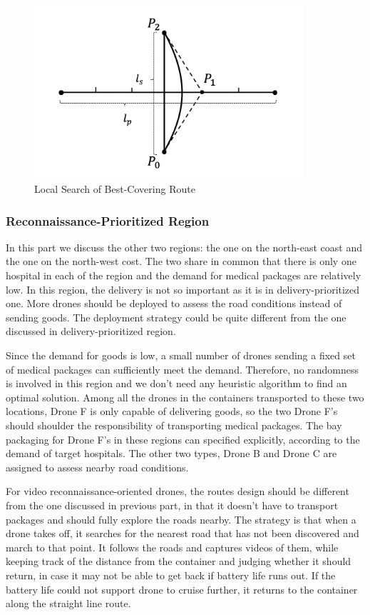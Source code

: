 \documentclass{mcmthesis}
\begin{document}
\begin{figure}[htbp]
    \centering
    \includegraphics[width=10cm]{figures/local_search_route.png}
    \caption{Local Search of Best-Covering Route}
    \label{Fig:lcsr}
\end{figure}

\subsubsection{Reconnaissance-Prioritized Region}\label{Subsub:reco}
In this part we discuss the other two regions: the one on the north-east coast and the one on the north-west cost. The two share in common that there is only one hospital in each of the region and the demand for medical packages are relatively low. In this region, the delivery is not so important as it is in delivery-prioritized one. More drones should be deployed to assess the road conditions instead of sending goods. The deployment strategy could be quite different from the one discussed in delivery-prioritized region.

Since the demand for goods is low, a small number of drones sending a fixed set of medical packages can sufficiently meet the demand. Therefore, no randomness is involved in this region and we don't need any heuristic algorithm to find an optimal solution. Among all the drones in the containers transported to these two locations, Drone F is only capable of delivering goods, so the two Drone F's should shoulder the responsibility of transporting medical packages. The bay packaging for Drone F's in these regions can specified explicitly, according to the demand of target hospitals. The other two types, Drone B and Drone C are assigned to assess nearby road conditions. 

For video reconnaissance-oriented drones, the routes design should be different from the one discussed in previous part, in that it doesn't have to transport packages and should fully explore the roads nearby. The strategy is that when a drone takes off, it searches for the nearest road that has not been discovered and march to that point. It follows the roads and captures videos of them, while keeping track of the distance from the container and judging whether it should return, in case it may not be able to get back if battery life runs out. If the battery life could not support drone to cruise further, it returns to the container along the straight line route.
\end{document}
